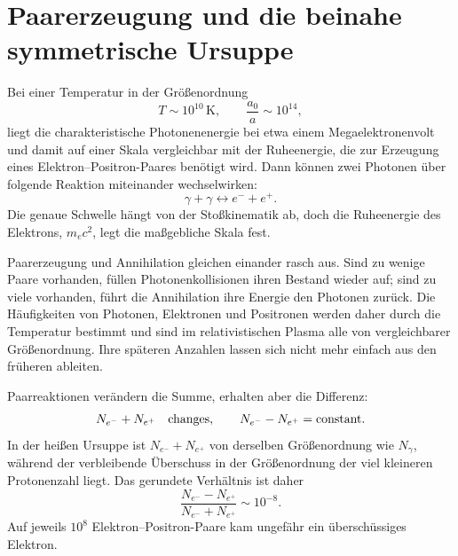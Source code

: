 \section{Paarerzeugung und die beinahe symmetrische Ursuppe}

Bei einer Temperatur in der Größenordnung
\begin{equation}
T\sim10^{10}\,\mathrm{K},
\qquad
\frac{a_0}{a}\sim10^{14},
\end{equation}
liegt die charakteristische Photonenenergie bei etwa einem Megaelektronenvolt und damit auf einer Skala vergleichbar mit der Ruheenergie, die zur Erzeugung eines Elektron--Positron-Paares benötigt wird. Dann können zwei Photonen über folgende Reaktion miteinander wechselwirken:
\begin{equation}
\gamma+\gamma
\longleftrightarrow
e^-+e^+.
\label{eq:c07-pair-reaction}
\end{equation}
Die genaue Schwelle hängt von der Stoßkinematik ab, doch die Ruheenergie des Elektrons, \(m_ec^2\), legt die maßgebliche Skala fest.

Paarerzeugung und Annihilation gleichen einander rasch aus. Sind zu wenige Paare vorhanden, füllen Photonenkollisionen ihren Bestand wieder auf; sind zu viele vorhanden, führt die Annihilation ihre Energie den Photonen zurück. Die Häufigkeiten von Photonen, Elektronen und Positronen werden daher durch die Temperatur bestimmt und sind im relativistischen Plasma alle von vergleichbarer Größenordnung. Ihre späteren Anzahlen lassen sich nicht mehr einfach aus den früheren ableiten.

\begin{classroomqa}
\end{classroomqa}

Paarreaktionen verändern die Summe, erhalten aber die Differenz:
\begin{equation}
N_{e^-}+N_{e^+}\quad\hbox{changes},
\qquad
N_{e^-}-N_{e^+}=\hbox{constant}.
\label{eq:c07-pair-invariants}
\end{equation}
In der heißen Ursuppe ist \(N_{e^-}+N_{e^+}\) von derselben Größenordnung wie \(N_\gamma\), während der verbleibende Überschuss in der Größenordnung der viel kleineren Protonenzahl liegt. Das gerundete Verhältnis ist daher
\begin{equation}
\boxed{
\frac{N_{e^-}-N_{e^+}}
{N_{e^-}+N_{e^+}}
\sim10^{-8}
}.
\label{eq:c07-asymmetry}
\end{equation}
Auf jeweils \(10^8\) Elektron--Positron-Paare kam ungefähr ein überschüssiges Elektron.

